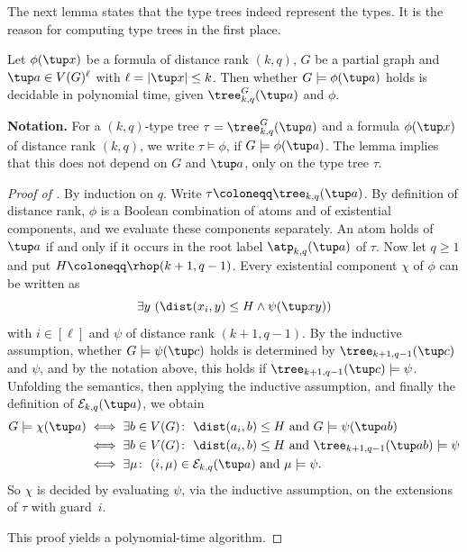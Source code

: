 The next lemma states that the type trees indeed represent the types. It is the reason for computing type trees in the first place.

\begin{lemma}[evaluation]\label{lem:eval}
Let $\phi(\tup x)$ be a \distFO formula of distance rank $(k,q)$, \(G\) be a partial graph and $\tup a\in V(G)^{\ell}$ with $\ell=|\tup x|\le k$.
Then whether $G\models\phi(\tup a)$ holds is decidable in polynomial time, given $\tree^G_{k,q}(\tup a)$ and $\phi$.
\end{lemma}

\textbf{Notation.} For a $(k,q)$-type tree $\tau=\tree^G_{k,q}(\tup a)$
and a \distFO formula $\phi(\tup x)$ of distance rank $(k,q)$,
we write $\tau \models\phi$, if $G\models\phi(\tup a)$.
The lemma implies that this does not depend on $G$ and $\tup a$, only on the type tree $\tau$.

\begin{proof}[Proof of ]
By induction on $q$.
Write $\tau\coloneqq\tree_{k,q}(\tup a)$.
By definition of distance rank, $\phi$ is a Boolean combination of atoms and of existential components, and we evaluate these components separately.
An atom holds of $\tup a$ if and only if it occurs in the root label $\atp_{k,q}(\tup a)$ of $\tau$.
Now let $q\ge1$ and put $H\coloneqq\rhop(k+1,q-1)$.
Every existential component $\chi$ of $\phi$ can be written as $$\exists y~(\dist(x_i,y)\le H\land\psi(\tup x y))$$ with $i\in[\ell]$ and $\psi$ of distance rank $(k+1,q-1)$.
By the inductive assumption, whether $G\models\psi(\tup c)$ holds is determined by $\tree_{k+1,q-1}(\tup c)$ and $\psi$, and by the notation above, this holds if $\tree_{k+1,q-1}(\tup c)\models \psi$.
Unfolding the semantics, then applying the inductive assumption, and finally the definition of $\mathcal E_{k,q}(\tup a)$, we obtain
\begin{align*}
G\models\chi(\tup a)
&\iff\exists b\in V(G)\colon\ \dist(a_i,b)\le H\ \text{and}\ G\models\psi(\tup ab)\\
&\iff\exists b\in V(G)\colon\ \dist(a_i,b)\le H\ \text{and}\ \tree_{k+1,q-1}(\tup ab)\models\psi\\
&\iff\exists\mu\colon\ (i,\mu)\in\mathcal E_{k,q}(\tup a)\ \text{and}\ \mu\models\psi.
\end{align*}
So $\chi$ is decided by evaluating $\psi$, via the inductive assumption, on the extensions of $\tau$ with guard~$i$.

This proof yields a polynomial-time algorithm.
\end{proof}

